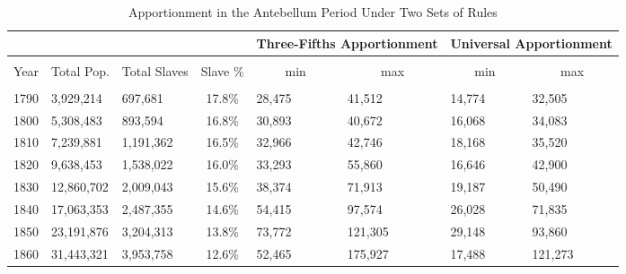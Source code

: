 
\begin{landscape}

\begin{table}[!htbp] \centering 
  \caption{Apportionment in the Antebellum Period Under Two Sets of Rules} 
  \label{tab:threefifths} 
\begin{tabular}{p{1.5cm}|p{2cm}p{2cm}p{2cm}|p{2cm}p{2cm}|p{2cm}p{2cm}}
\multicolumn{1}{c}{} & \multicolumn{1}{c}{} & \multicolumn{1}{c}{}& \multicolumn{1}{c}{} & \multicolumn{2}{c}{Three-Fifths Apportionment} & \multicolumn{2}{c}{Universal Apportionment} \\ 
\hline \\[-1.8ex] 
\multicolumn{1}{c}{Year} & \multicolumn{1}{c}{Total Pop.} & \multicolumn{1}{c}{Total Slaves} & \multicolumn{1}{c}{Slave \%} & \multicolumn{1}{c}{min} & \multicolumn{1}{c}{max} & \multicolumn{1}{c}{min} & \multicolumn{1}{c}{max} \\ 
\hline \\[-1.8ex] 
\multicolumn{1}{c}{1790} & 3,929,214 & 697,681 & \multicolumn{1}{c}{17.8\%} & 28,475 & 41,512 & 14,774 & 32,505 \\ 
\multicolumn{1}{c}{1800} & 5,308,483 & 893,594 & \multicolumn{1}{c}{16.8\%} & 30,893 & 40,672 & 16,068 & 34,083 \\ 
\multicolumn{1}{c}{1810} & 7,239,881 & 1,191,362 & \multicolumn{1}{c}{16.5\%} & 32,966 & 42,746 & 18,168 & 35,520 \\ 
\multicolumn{1}{c}{1820} & 9,638,453 & 1,538,022 & \multicolumn{1}{c}{16.0\%} & 33,293 & 55,860 & 16,646 & 42,900 \\ 
\multicolumn{1}{c}{1830} & 12,860,702 & 2,009,043 & \multicolumn{1}{c}{15.6\%} & 38,374 & 71,913 & 19,187 & 50,490 \\ 
\multicolumn{1}{c}{1840} & 17,063,353 & 2,487,355 & \multicolumn{1}{c}{14.6\%} & 54,415 & 97,574 & 26,028 & 71,835 \\ 
\multicolumn{1}{c}{1850} & 23,191,876 & 3,204,313 & \multicolumn{1}{c}{13.8\%} & 73,772 & 121,305 & 29,148 & 93,860 \\ 
\multicolumn{1}{c}{1860} & 31,443,321 & 3,953,758 & \multicolumn{1}{c}{12.6\%} & 52,465 & 175,927 & 17,488 & 121,273 \\ 
\end{tabular}
\tabnotes{}
\end{table}

\end{landscape}
 
